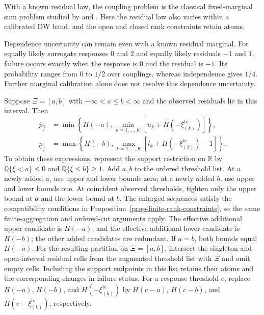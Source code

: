 \documentclass[review,11pt,3p,authoryear,nopreprintline]{elsarticle}
\begin{document}
With a known residual law, the coupling problem is the classical fixed-marginal sum problem studied by \citet{M82} and \citet{F.N.S87}. Here the residual law also varies within a calibrated DW band, and the open and closed rank constraints retain atoms.

Dependence uncertainty can remain even with a known residual marginal. For equally likely surrogate responses $0$ and $2$ and equally likely residuals $-1$ and $1$, failure occurs exactly when the response is $0$ and the residual is $-1$. Its probability ranges from $0$ to $1/2$ over couplings, whereas independence gives $1/4$. Further marginal calibration alone does not resolve this dependence uncertainty.

\begin{remark}
  \label{rem-interval-support}
  Suppose $\Xi=[a,b]$ with $-\infty<a\le b<\infty$ and the observed residuals lie in this interval. Then
  \begin{align*}
    \overline p_{\hat f}
    &=\min\left\{H(-a),\min_{k=1,\ldots,K}[u_k+H\left(-\xi_{(k)}^{\mathrm{te}}\right)]\right\},\\
    \underline p_{\hat f}
    &=\max\left\{H(-b),\max_{k=1,\ldots,K}[l_k+H\left(-\xi_{(k)}^{\mathrm{te}}\right)-1]\right\}.
  \end{align*}
  To obtain these expressions, represent the support restriction on $\mathbb R$ by
  $\mathbb Q\{\xi<a\}\le0$ and $\mathbb Q\{\xi\le b\}\ge1$.
  Add $a,b$ to the ordered threshold list. At a newly added $a$, use upper and lower bounds zero; at a newly added $b$, use upper and lower bounds one. At coincident observed thresholds, tighten only the upper bound at $a$ and the lower bound at $b$. The enlarged sequences satisfy the compatibility conditions in Proposition~\ref{prop-finite-rank-constraints}, so the same finite-aggregation and ordered-cut arguments apply. The effective additional upper candidate is $H(-a)$, and the effective additional lower candidate is $H(-b)$; the other added candidates are redundant. If $a=b$, both bounds equal $H(-a)$. For the resulting partition on $\Xi=[a,b]$, intersect the singleton and open-interval residual cells from the augmented threshold list with $\Xi$ and omit empty cells. Including the support endpoints in this list retains their atoms and the corresponding changes in failure status. For a response threshold $c$, replace $H(-a)$, $H(-b)$, and $H\left(-\xi_{(k)}^{\mathrm{te}}\right)$ by $H(c-a)$, $H(c-b)$, and $H\left(c-\xi_{(k)}^{\mathrm{te}}\right)$, respectively.
\end{remark}
\end{document}
